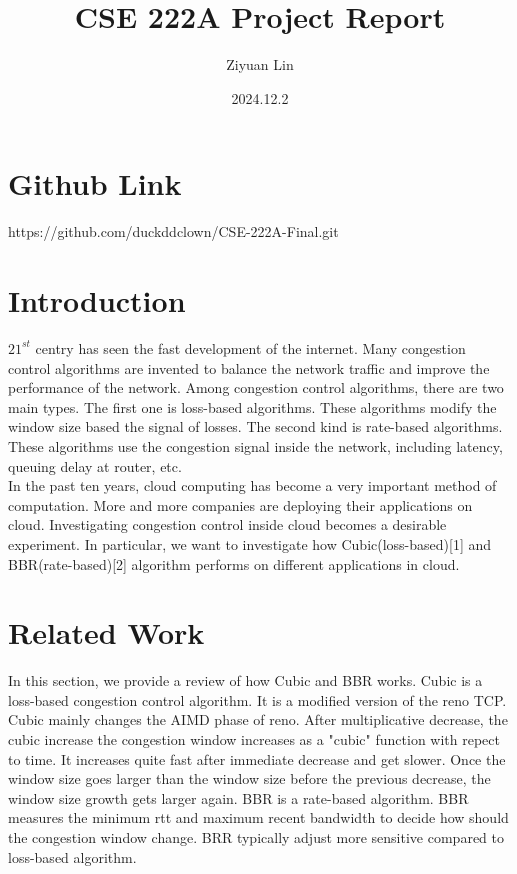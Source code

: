 \documentclass{article}
\title{CSE 222A Project Report}
\author{Ziyuan Lin}
\date{2024.12.2}
\begin{document}
\maketitle

\section{Github Link}
https://github.com/duckddclown/CSE-222A-Final.git

\section{Introduction}
$21^{st}$ centry has seen the fast development of the internet. Many congestion control algorithms are invented to balance the network traffic and improve the performance of the network.
Among congestion control algorithms, there are two main types. The first one is loss-based algorithms. These algorithms modify the window size based the signal of losses. The second kind is 
rate-based algorithms. These algorithms use the congestion signal inside the network, including latency, queuing delay at router, etc.
\\[6pt]
In the past ten years, cloud computing has become a very important method of computation. More and more companies are deploying their applications on cloud. Investigating congestion control
inside cloud becomes a desirable experiment. In particular, we want to investigate how Cubic(loss-based)[1] and BBR(rate-based)[2] algorithm performs on different applications in cloud. 

\section{Related Work}
In this section, we provide a review of how Cubic and BBR works. Cubic is a loss-based congestion control algorithm. It is a modified version of the reno TCP. Cubic mainly changes the AIMD phase
of reno. After multiplicative decrease, the cubic increase the congestion window increases as a "cubic" function with repect to time. It increases quite fast after immediate decrease and get slower.
Once the window size goes larger than the window size before the previous decrease, the window size growth gets larger again. BBR is a rate-based algorithm. BBR measures the minimum rtt and maximum
recent bandwidth to decide how should the congestion window change. BRR typically adjust more sensitive compared to loss-based algorithm.
\end{document}

